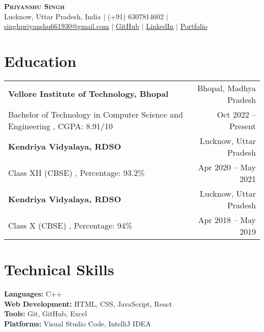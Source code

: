 \documentclass[letterpaper,10pt]{article}
\begin{document}

\begin{center}
    \textbf{\Huge \scshape Priyanshu Singh} \\ \vspace{1pt}
    \small Lucknow, Uttar Pradesh, India $|$ (+91) 6307814602 $|$ \href{mailto:singhpriyanshu661930@gmail.com}{singhpriyanshu661930@gmail.com} $|$ 
    \href{https://github.com/priyanshusingh017}{GitHub} $|$
    \href{https://www.linkedin.com/in/priyanshu-singh-00s7}{LinkedIn} $|$
    \href{https://priyanshusingh017.github.io/Portfolio/}{Portfolio}
\end{center}

\section{Education}
\begin{tabularx}{\linewidth}{X r}
  \textbf{Vellore Institute of Technology, Bhopal} & Bhopal, Madhya Pradesh \\
  \hspace{0.5em}Bachelor of Technology in Computer Science and Engineering , CGPA: 8.91/10 & Oct 2022 -- Present \\[5pt]
  
  \textbf{Kendriya Vidyalaya, RDSO} & Lucknow, Uttar Pradesh \\
  \hspace{0.5em}Class XII (CBSE) , Percentage: 93.2\% & Apr 2020 -- May 2021 \\[5pt]
  
  \textbf{Kendriya Vidyalaya, RDSO} & Lucknow, Uttar Pradesh \\
  \hspace{0.5em}Class X (CBSE) , Percentage: 94\% & Apr 2018 -- May 2019 \\
\end{tabularx}

\section{Technical Skills}
\begin{itemize}[leftmargin=0.15in, label={}, noitemsep, nolistsep]
  \small{
    \item{
      \textbf{Languages:} C++ \\
      \textbf{Web Development:} HTML, CSS, JavaScript, React \\
      \textbf{Tools:} Git, GitHub, Excel \\
      \textbf{Platforms:} Visual Studio Code, IntelliJ IDEA \\
    }
  }
\end{itemize}
\end{document}
